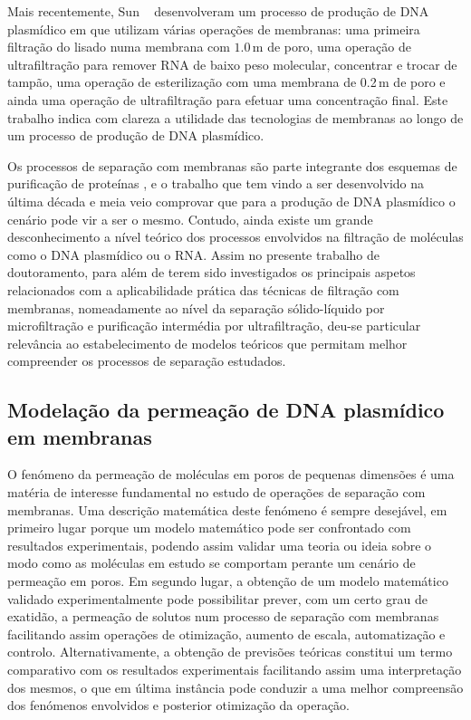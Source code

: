 Mais recentemente, Sun \et\ \cite{sun13} desenvolveram um processo de produção de DNA plasmídico em que utilizam várias operações de membranas: uma primeira filtração do lisado numa membrana com $1.0$\,\micro m de poro, uma operação de ultrafiltração para remover RNA de baixo peso molecular, concentrar e trocar de tampão, uma operação de esterilização com uma membrana de 0.2\,\micro m de poro e ainda uma operação de ultrafiltração para efetuar uma concentração final. Este trabalho indica com clareza a utilidade das tecnologias de membranas ao longo de um processo de produção de DNA plasmídico.

Os processos de separação com membranas são parte integrante dos esquemas de purificação de proteínas \cite{reis}, e o trabalho que tem vindo a ser desenvolvido na última década e meia veio comprovar que para a produção de DNA plasmídico o cenário pode vir a ser o mesmo. Contudo, ainda existe um grande desconhecimento a nível teórico dos processos envolvidos na filtração de moléculas como o DNA plasmídico ou o RNA. Assim no presente trabalho de doutoramento, para além de terem sido investigados os principais aspetos relacionados com a aplicabilidade prática das técnicas de filtração com membranas, nomeadamente ao nível da separação sólido-líquido por microfiltração e purificação intermédia por ultrafiltração, deu-se particular relevância ao estabelecimento de modelos teóricos que permitam melhor compreender os processos de separação estudados. 

\subsection{Modelação da permeação de DNA plasmídico em membranas}
\label{sec:modulaçãopermeação}
O fenómeno da permeação de moléculas em poros de pequenas dimensões é uma matéria de interesse fundamental no estudo de operações de separação com membranas. Uma descrição matemática deste fenómeno é sempre desejável, em primeiro lugar porque um modelo matemático pode ser confrontado com resultados experimentais, podendo assim validar uma teoria ou ideia sobre o modo como as moléculas em estudo se comportam perante um cenário de permeação em poros. Em segundo lugar, a obtenção de um modelo matemático validado experimentalmente pode possibilitar prever, com um certo grau de exatidão, a permeação de solutos num processo de separação com membranas facilitando assim operações de otimização, aumento de escala, automatização e controlo. Alternativamente, a obtenção de previsões teóricas constitui um termo comparativo com os resultados experimentais facilitando assim uma interpretação dos mesmos, o que em última instância pode conduzir a uma melhor compreensão dos fenómenos envolvidos e posterior otimização da operação.  

